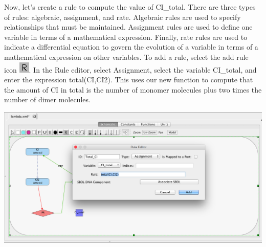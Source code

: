 \documentclass[titlepage,11pt]{article}
\begin{document}

Now, let's create a rule to compute the value of CI\_total.  There are three types of rules: algebraic, assignment, and rate.  Algebraic rules are used to specify relationships that must be maintained.  Assignment rules are used to define one variable in terms of a mathematical expression.  Finally, rate rules are used to indicate a differential equation to govern the evolution of a variable in terms of a mathematical expression on other variables.  To add a rule, select the add rule icon
\includegraphics{../gui/icons/modelview/rule_mode_selected}.  In the Rule editor, 
select Assignment, select the variable CI\_total, and enter the expression total(CI,CI2).  This uses our new function to compute that the amount of CI in total is the number of monomer molecules plus two times the number of dimer molecules.

\begin{center}
\includegraphics[width=160mm]{screenshots/rule}
\end{center}


\end{document}
